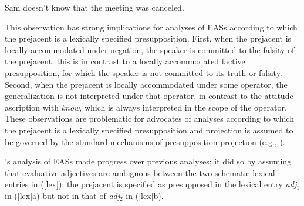 \documentclass[11pt,fleqn]{article}
\newcommand{\6}{\mbox{$[\hspace*{-.6mm}[$}}
\newcommand{\9}{\mbox{$]\hspace*{-.6mm}]$}}
\newcommand{\citepos}[1]{\citeauthor{#1}'s \citeyear{#1}}
\begin{document}
\begin{exe}
\ex\label{stop} Sam doesn't know that the meeting was canceled.
\end{exe}
This observation has strong implications for analyses of EASs according to which the prejacent is a lexically specified presupposition. First, when the prejacent is locally accommodated under negation, the speaker is committed to the falsity of the prejacent; this is in contrast to a locally accommodated factive presupposition, for which the speaker is not committed to its truth or falsity. Second, when the prejacent is locally accommodated under some operator, the generalization is not interpreted under that operator, in contrast to the attitude ascription with {\em know}, which is always interpreted in the scope of the operator. These observations are problematic for advocates of analyses according to which the prejacent is a lexically specified presupposition and projection is assumed to be governed by the standard mechanisms of presupposition projection (e.g., \citealt{heim83,vds92}). 

\citepos{karttunen-etal2014} analysis of EASs made progress over previous analyses; it did so by assuming that evaluative adjectives are ambiguous between the two schematic lexical entries in (\ref{lex}): the prejacent is specified as presupposed in the lexical entry {\em adj}$_1$ in  (\ref{lex}a) but not in that of {\em adj}$_2$ in (\ref{lex}b). 
\end{document}
